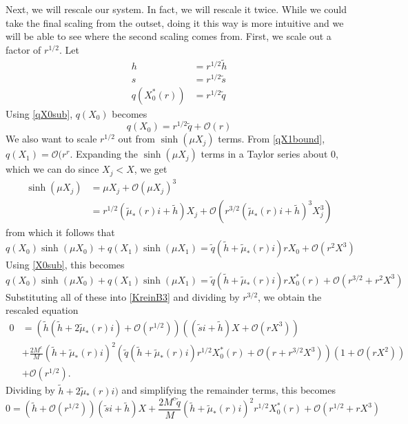 \documentclass[thesis.tex]{subfiles}
\begin{document}
Next, we will rescale our system. In fact, we will rescale it twice. While we could take the final scaling from the outset, doing it this way is more intuitive and we will be able to see where the second scaling comes from. First, we scale out a factor of $r^{1/2}$. Let
\begin{align*}
h &= r^{1/2} \tilde{h} \\
s &= r^{1/2} \tilde{s} \\
q(X_0^*(r)) &= r^{1/2} \tilde{q}
\end{align*}
Using \cref{qX0sub}, $q(X_0)$ becomes
\[
q(X_0) = r^{1/2}\tilde{q} + \mathcal{O}(r)
\]
We also want to scale $r^{1/2}$ out from $\sinh(\mu X_j)$ terms. From \cref{qX1bound}, $q(X_1) = \mathcal{O}(r^r$. Expanding the $\sinh(\mu X_j)$ terms in a Taylor series about 0, which we can do since $X_j < X$, we get
\begin{align*}
\sinh(\mu X_j) &= \mu X_j + \mathcal{O}(\mu X_j)^3 \\
&= r^{1/2}(\tilde{\mu}_*(r)i + \tilde{h})X_j + \mathcal{O}(r^{3/2} (\tilde{\mu}_*(r)i + \tilde{h})^3 X_j^3)
\end{align*}
from which it follows that
\[
q(X_0) \sinh(\mu X_0) + q(X_1) \sinh(\mu X_1)
= \tilde{q}(\tilde{h} + \tilde{\mu}_*(r)i )r X_0 + \mathcal{O}(r^2 X^3)
\]
Using \cref{X0sub}, this becomes
\[
q(X_0) \sinh(\mu X_0) + q(X_1) \sinh(\mu X_1)
= \tilde{q}(\tilde{h} + \tilde{\mu}_*(r)i )r X_0^*(r) + \mathcal{O}(r^{3/2} + r^2 X^3)
\]
Substituting all of these into \cref{KreinB3} and dividing by $r^{3/2}$, we obtain the rescaled equation
\begin{equation}\label{KreinB4}
\begin{aligned}
0 &= \left( \tilde{h} ( \tilde{h} + 2 \tilde{\mu}_*(r) i) +  \mathcal{O}( r^{1/2} )\right) \left( (\tilde{s}i + \tilde{h})X + \mathcal{O}\left( r X^3 \right)  \right) \\
&+\frac{2 M^c}{M} ( \tilde{h} + \tilde{\mu}_*(r) i)^2 \left( \tilde{q}(\tilde{h} + \tilde{\mu}_*(r)i )r^{1/2} X_0^*(r) + \mathcal{O}(r + r^{3/2} X^3) \right) \left( 1 + \mathcal{O}\left( r X^2 \right) \right) \\
&+ \mathcal{O}( r^{1/2} ).
\end{aligned}
\end{equation}
Dividing by $\tilde{h} + 2 \tilde{\mu}_*(r) i)$ and simplifying the remainder terms, this becomes
\begin{equation}\label{KreinB4a}
0 = \left( \tilde{h} + \mathcal{O}( r^{1/2} )\right) (\tilde{s}i + \tilde{h})X  +\frac{2 M^c \tilde{q} }{M} ( \tilde{h} + \tilde{\mu}_*(r) i)^2 r^{1/2} X_0^*(r) + \mathcal{O}(r^{1/2} + r X^3)
\end{equation}
\end{document}
